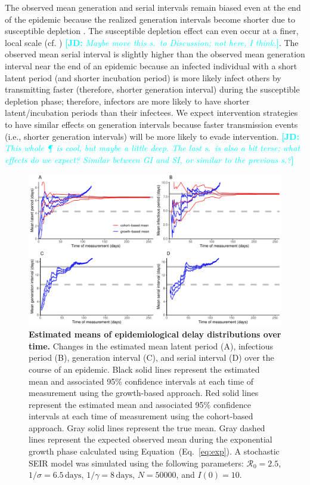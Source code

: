 \documentclass[12pt]{article}
\newcommand{\eref}[1]{(Eq.~\ref{eq:#1})}
\newcommand{\comment}[3]{\textcolor{#1}{\textbf{[#2: }\textsl{#3}\textbf{]}}}
\newcommand{\jd}[1]{\comment{cyan}{JD}{#1}}
\begin{document}
The observed mean generation and serial intervals remain biased even at the end of the epidemic because the realized generation intervals become shorter due to susceptible depletion \citep{champredon2015intrinsic}.
The susceptible depletion effect can even occur at a finer, local scale (cf. \cite{park2019inferring}) \jd{Maybe move this s.\ to Discussion; not here, I think.}.
The observed mean serial interval is slightly higher than the observed mean generation interval near the end of an epidemic because an infected individual with a short latent period (and shorter incubation period) is more likely infect others by transmitting faster (therefore, shorter generation interval) during the susceptible depletion phase; therefore, infectors are more likely to have shorter latent/incubation periods than their infectees.
We expect intervention strategies to have similar effects on generation intervals because faster transmission events (i.e., shorter generation intervals) will be more likely to evade intervention.
\jd{This whole \P\ is cool, but maybe a little deep. The last s.\ is also a bit terse; what effects do we expect? Similar between GI and SI, or similar to the previous s.?}

\begin{figure}[!th]
\includegraphics[width=\textwidth]{figure_seir2.pdf}
\caption{
\textbf{Estimated means of epidemiological delay distributions over time.}
Changes in the estimated mean latent period (A), infectious period (B), generation interval (C), and serial interval (D) over the course of an epidemic.
Black solid lines represent the estimated mean and associated 95\% confidence intervals at each time of measurement using the growth-based approach.
Red solid lines represent the estimated mean and associated 95\% confidence intervals at each time of measurement using the cohort-based approach.
Gray solid lines represent the true mean.
Gray dashed lines represent the expected observed mean during the exponential growth phase calculated using Equation~\eref{exp}.
A stochastic SEIR model was simulated using the following parameters: $\mathcal R_0 = 2.5$, $1/\sigma = 6.5\,\textrm{days}$, $1/\gamma = 8\,\textrm{days}$, $N=50000$, and $I(0)=10$.
}
\label{fig:seir2}
\end{figure}
\end{document}
